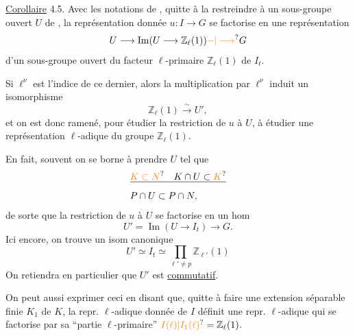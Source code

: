 \uline{Corollaire} 4.5. Avec les notations de , quitte à  la restreindre à un sous-groupe ouvert  $U$ de , la représentation donnée $u:I\longrightarrow G$ se factorise en une représentation
\[
U\longrightarrow\operatorname{Im}(U\longrightarrow\mathbb Z_\ell(1))\unsure{-|\longrightarrow}G
\]
d'un sous-groupe ouvert  du facteur  $\ell$-primaire $\mathbb Z_\ell(1)$ de $I_t$.

Si $\ell^\nu$ est l'indice de ce dernier, alors la multiplication par $\ell^\nu$ induit un isomorphisme
\[
\mathbb Z_\ell(1)\xrightarrow{\sim}U',
\tag*{(4.7)}
\]
et on est donc ramené, pour étudier la restriction de $u$ à $U$, à étudier une représentation $\ell$-adique du groupe $\mathbb Z_\ell(1)$.

En fait, souvent on se borne à prendre $U$ tel que
\[
\begin{aligned}
&\deleted{\unsure{K\subset N}\quad K\cap U\subset\unsure{K}}\\
&P\cap U\subset P\cap N,
\end{aligned}
\]
de sorte que la restriction de $u$ à $U$ se factorise en un hom
\[
U'=\operatorname{Im}(U\longrightarrow I_t)\longrightarrow G.
\]
Ici encore, on trouve un isom canonique
\[
U'\simeq I_t\simeq\prod_{\ell'\ne p}\mathbb Z_{\ell'}(1)
\tag*{(4.8)}
\]
On retiendra en particulier que $U'$ est \uline{commutatif}.

 On peut aussi exprimer ceci en disant que, quitte à faire une extension séparable finie $K_1$ de $K$, la repr. $\ell$-adique donnée de $I$ définit une repr. $\ell$-adique  qui se factorise par sa ``partie $\ell$-primaire'' $\unsure{I(\ell)|I_1(\ell)}=\mathbb Z_\ell(1)$.

